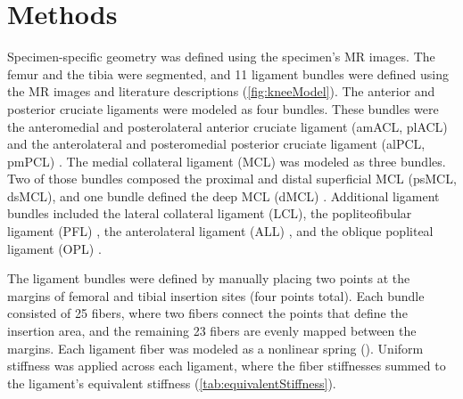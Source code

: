 \section{Methods}
Specimen-specific geometry was defined using the specimen's MR images. The femur and the tibia were segmented, and 11 ligament bundles were defined using the MR images and literature descriptions (\autoref{fig:kneeModel}). The anterior and posterior cruciate ligaments were modeled as four bundles. These bundles were the anteromedial and posterolateral anterior cruciate ligament (amACL, plACL) \citep{duthon_anatomy_2006} and the anterolateral and posteromedial posterior cruciate ligament (alPCL, pmPCL) \citep{anderson_arthroscopically_2012}. The medial collateral ligament (MCL) was modeled as three bundles. Two of those bundles composed the proximal and distal superficial MCL (psMCL, dsMCL), and one bundle defined the deep MCL (dMCL)  \citep{laprade_anatomy_2007-1}. Additional ligament bundles included the lateral collateral ligament (LCL), the popliteofibular ligament (PFL) \citep{laprade_posterolateral_2003}, the anterolateral ligament (ALL) \citep{claes_anatomy_2013}, and the oblique popliteal ligament (OPL) \citep{laprade_anatomy_2007,hedderwick_oblique_2017}. 

The ligament bundles were defined by manually placing two points at the margins of femoral and tibial insertion sites (four points total). Each bundle consisted of 25 fibers, where two fibers connect the points that define the insertion area, and the remaining 23 fibers are evenly mapped between the margins. Each ligament fiber was modeled as a nonlinear spring (\cite{blankevoort_validation_1996}). Uniform stiffness was applied across each ligament, where the fiber stiffnesses summed to the ligament's equivalent stiffness (\autoref{tab:equivalentStiffness}).

